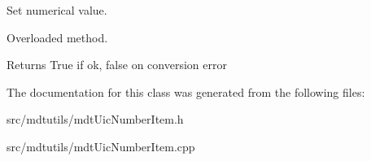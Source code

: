 Set numerical value. 

Overloaded method. \begin{DoxyReturn}{Returns}
True if ok, false on conversion error 
\end{DoxyReturn}


The documentation for this class was generated from the following files:\begin{DoxyCompactItemize}
\item 
src/mdtutils/mdtUicNumberItem.h\item 
src/mdtutils/mdtUicNumberItem.cpp\end{DoxyCompactItemize}
